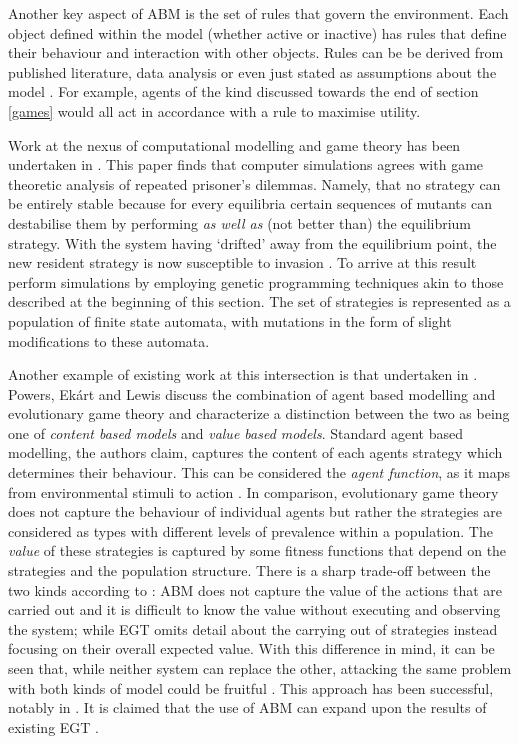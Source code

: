 \documentclass[11pt]{book}
\newcommand*{\np}{\par\noindent\newline}
\begin{document}
\np Another key aspect of ABM is the set of rules that govern the environment. Each object defined within the model
(whether active or inactive) has rules that define their behaviour and interaction with other objects. Rules can be be
derived from published literature, data analysis or even just stated as assumptions about the model
\citep{heppenstall_introduction_2012}. For example, agents of the kind discussed towards the end of section \ref{games}
would all act in accordance with a rule to maximise utility. 

\np Work at the nexus of computational modelling and game theory has been undertaken in \citet{garcia_no_2018}. This
paper finds that computer simulations agrees with game theoretic analysis of repeated prisoner's dilemmas. Namely, that
no strategy can be entirely stable because for every equilibria certain sequences of mutants can destabilise them by
performing \textit{as well as} (not better than) the equilibrium strategy. With the system having `drifted' away from
the equilibrium point, the new resident strategy is now susceptible to invasion \citep{garcia_no_2018}. To arrive at
this result \citet{garcia_no_2018} perform simulations by employing genetic programming techniques akin to those
described at the beginning of this section. The set of strategies is represented as a population of finite state
automata, with mutations in the form of slight modifications to these automata.

\np Another example of existing work at this intersection is that undertaken in \citet{powers_modelling_2018}. Powers,
Ekárt and Lewis discuss the combination of agent based modelling and evolutionary game theory and characterize a
distinction between the two as being one of \textit{content based models} and \textit{value based models}. Standard
agent based modelling, the authors claim, captures the content of each agents strategy which determines their behaviour.
This can be considered the \textit{agent function}, as it maps from environmental stimuli to action \citep[~p.
69]{powers_modelling_2018}. In comparison, evolutionary game theory does not capture the behaviour of individual agents
but rather the strategies are considered as types with different levels of prevalence within a population. The
\textit{value} of these strategies is captured by some fitness functions that depend on the strategies and the
population structure. There is a sharp trade-off between the two kinds according to \citet{powers_modelling_2018}: ABM
does not capture the value of the actions that are carried out and it is difficult to know the value without executing
and observing the system; while EGT omits detail about the carrying out of strategies instead focusing on their overall
expected value. With this difference in mind, it can be seen that, while neither system can replace the other, attacking
the same problem with both kinds of model could be fruitful \citep{powers_modelling_2018}. This approach has
been successful, notably in \citep{axelrod_effective_1980}. It is claimed that the use of ABM can expand upon the results of existing EGT \citep[~p.71]{powers_modelling_2018}.
\end{document}
